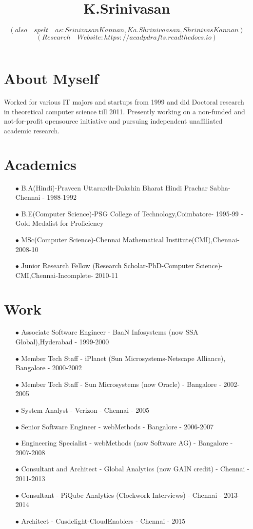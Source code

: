 \documentclass[11pt,onecolumn]{article}
\author{ $ (also \quad spelt \quad as: Srinivasan Kannan, Ka.Shrinivaasan, Shrinivas Kannan)$ \\
$ (Research \quad Website: https://acadpdrafts.readthedocs.io) $ \\
}
\title{K.Srinivasan}
\date{}
\begin{document}
\thispagestyle{empty}
\pagestyle{empty}
\maketitle

\section{About Myself}
Worked for various IT majors and startups from 1999 and did Doctoral research in theoretical computer science till 2011. Presently working on a non-funded and not-for-profit opensource initiative and pursuing independent unaffiliated academic research.

\section{Academics}
\begin{enumerate}
\item[$\bullet$] B.A(Hindi)-Praveen Uttarardh-Dakshin Bharat Hindi Prachar Sabha-Chennai - 1988-1992
\item[$\bullet$] B.E(Computer Science)-PSG College of Technology,Coimbatore- 1995-99 - Gold Medalist for Proficiency
\item[$\bullet$] MSc(Computer Science)-Chennai Mathematical Institute(CMI),Chennai- 2008-10
\item[$\bullet$] Junior Research Fellow (Research Scholar-PhD-Computer Science)-CMI,Chennai-Incomplete- 2010-11
\end{enumerate}

\section{Work}
\begin{enumerate}
\item[$\bullet$] Associate Software Engineer - BaaN Infosystems (now SSA Global),Hyderabad - 1999-2000
\item[$\bullet$] Member Tech Staff - iPlanet (Sun Microsystems-Netscape Alliance), Bangalore - 2000-2002
\item[$\bullet$] Member Tech Staff - Sun Microsystems (now Oracle) - Bangalore - 2002-2005
\item[$\bullet$] System Analyst - Verizon - Chennai - 2005
\item[$\bullet$] Senior Software Engineer - webMethods - Bangalore - 2006-2007
\item[$\bullet$] Engineering Specialist - webMethods (now Software AG) - Bangalore - 2007-2008
\item[$\bullet$] Consultant and Architect - Global Analytics (now GAIN credit) - Chennai - 2011-2013
\item[$\bullet$] Consultant - PiQube Analytics (Clockwork Interviews) - Chennai - 2013-2014
\item[$\bullet$] Architect - Cusdelight-CloudEnablers - Chennai - 2015
\end{enumerate}
\end{document}
